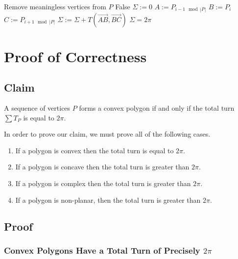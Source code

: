 \documentclass{article}
\newcommand{\vecl}{\overrightarrow} %
\begin{document}
\begin{algorithm}[htbp]
	\begin{algorithmic}
		\State Remove meaningless vertices from \(P\)
		\Return False
		\EndIf
		\State \(\Sigma := 0\) 
		\State \(A := P_{i-1 \mod |P|}\) 
		\State \(B := P_{i}\) 
		\State \(C := P_{i+1 \mod |P|}\) 
		\State \(\Sigma := \Sigma + T(\vecl{AB}, \vecl{BC})\) 
		\EndFor
		\State\Return \(\Sigma = 2\pi\)
		\EndFunction
	\end{algorithmic}
\end{algorithm}

\section{Proof of Correctness}

\subsection{Claim}

A sequence of vertices \(P\) forms a convex polygon if and only if the total turn \(\sum T_P\) is equal to \(2\pi\).

In order to prove our claim, we must prove all of the following cases.
\begin{enumerate}
	\item If a polygon is convex then the total turn is equal to \(2\pi\).
	\item If a polygon is concave then the total turn is greater than \(2\pi\).
	\item If a polygon is complex then the total turn is greater than \(2\pi\).
	\item If a polygon is non-planar, then the total turn is greater than \(2\pi\).
\end{enumerate}

\subsection{Proof}

\subsubsection{Convex Polygons Have a Total Turn of Precisely \(2\pi\)}
\end{document}
